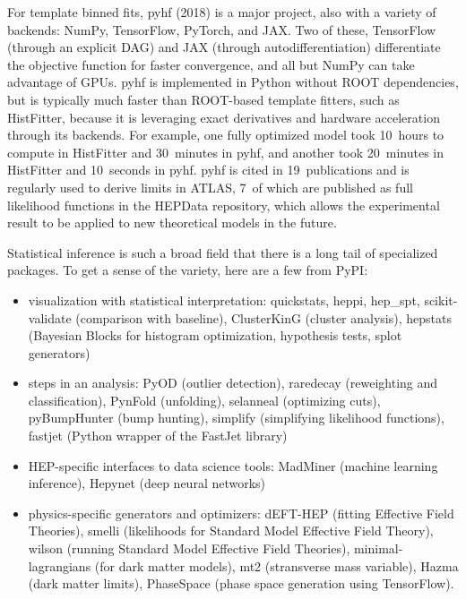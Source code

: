 \documentclass{article}
\begin{document}
For template binned fits, pyhf (2018) is a major project, also with a variety of backends: NumPy, TensorFlow, PyTorch, and JAX. Two of these, TensorFlow (through an explicit DAG) and JAX (through autodifferentiation) differentiate the objective function for faster convergence, and all but NumPy can take advantage of GPUs. pyhf is implemented in Python without ROOT dependencies, but is typically much faster than ROOT-based template fitters, such as HistFitter, because it is leveraging exact derivatives and hardware acceleration through its backends. For example, one fully optimized model took 10~hours to compute in HistFitter and 30~minutes in pyhf, and another took 20~minutes in HistFitter and 10~seconds in pyhf. pyhf is cited in 19~publications and is regularly used to derive limits in ATLAS, 7~of which are published as full likelihood functions in the HEPData repository, which allows the experimental result to be applied to new theoretical models in the future.

Statistical inference is such a broad field that there is a long tail of specialized packages. To get a sense of the variety, here are a few from PyPI:

\begin{itemize}
\item visualization with statistical interpretation: quickstats, heppi, hep\_spt, scikit-validate (comparison with baseline), ClusterKinG (cluster analysis), hepstats (Bayesian Blocks for histogram optimization, hypothesis tests, splot generators)
\item steps in an analysis: PyOD (outlier detection), raredecay (reweighting and classification), PynFold (unfolding), selanneal (optimizing cuts), pyBumpHunter (bump hunting), simplify (simplifying likelihood functions), fastjet (Python wrapper of the FastJet library)
\item HEP-specific interfaces to data science tools: MadMiner (machine learning inference), Hepynet (deep neural networks)
\item physics-specific generators and optimizers: dEFT-HEP (fitting Effective Field Theories), smelli (likelihoods for Standard Model Effective Field Theory), wilson (running Standard Model Effective Field Theories), minimal-lagrangians (for dark matter models), mt2 (stransverse mass variable), Hazma (dark matter limits), PhaseSpace (phase space generation using TensorFlow).
\end{itemize}
\end{document}
